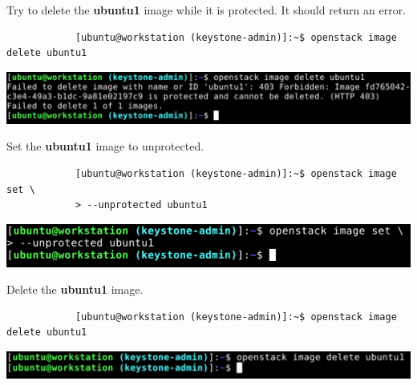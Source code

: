 \documentclass[letterpaper, 12pt]{article}
\begin{document}
\begin{enumerate}
    \begin{labstep}
        Try to delete the \textbf{ubuntu1} image while it is protected.
        It should return an error.
        \begin{lstlisting}
            [ubuntu@workstation (keystone-admin)]:~$ openstack image delete ubuntu1
        \end{lstlisting}

        \begin{center}
            \includegraphics[width=\linewidth]{images/part1/step15.png}
        \end{center}
    \end{labstep}

    \begin{labstep}
        Set the \textbf{ubuntu1} image to unprotected.
        \begin{lstlisting}
            [ubuntu@workstation (keystone-admin)]:~$ openstack image set \
            > --unprotected ubuntu1
        \end{lstlisting}

        \begin{center}
            \includegraphics[width=\linewidth]{images/part1/step16.png}
        \end{center}
    \end{labstep}

    \begin{labstep}
        Delete the \textbf{ubuntu1} image.
        \begin{lstlisting}
            [ubuntu@workstation (keystone-admin)]:~$ openstack image delete ubuntu1
        \end{lstlisting}

        \begin{center}
            \includegraphics[width=\linewidth]{images/part1/step17.png}
        \end{center}
    \end{labstep}


\end{enumerate}
\end{document}
